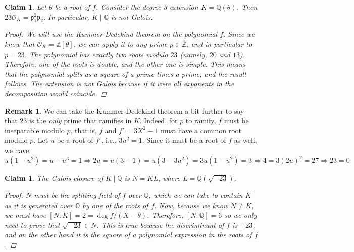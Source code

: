 \documentclass[11pt]{article}
\newtheorem{claim}[theorem]{Claim}
\theoremstyle{definition}
\newtheorem*{rk}{Remark}
\begin{document}
    \begin{claim}
        Let $\theta$ be a root of $f$.
        Consider the degree 3 extension $K = \mathbb{Q}(\theta)$.
        Then $23 \mathcal{O}_K = \mathfrak{p}_1^2 \mathfrak{p}_2$.
        In particular, $K\mid\mathbb{Q}$ is not Galois.
        \begin{proof}
            We will use the Kummer-Dedekind theorem on the polynomial $f$.
            Since we know that $\mathcal{O}_K = \mathbb{Z}[\theta]$, we can apply it to any prime $p \in \mathbb{Z}$,
            and in particular to $p = 23$.
            The polynomial has exactly two roots modulo $23$ (namely, $20$ and $13$).
            Therefore, one of the roots is double, and the other one is simple.
            This means that the polynomial splits as a square of a prime times a prime,
            and the result follows.
            The extension is not Galois because if it were all exponents in the decomposition would coincide.
        \end{proof}
    \end{claim}

    \begin{rk}
        We can take the Kummer-Dedekind theorem a bit further to say that $23$ is the \textit{only} prime that ramifies in $K$.
        Indeed, for $p$ to ramify, $f$ must be inseparable modulo $p$, that is, $f$ and $f' = 3X^2-1$ must have a common root modulo $p$.
        Let $u$ be a root of $f'$, i.e., $3u^2=1$.
        Since it must be a root of $f$ as well, we have:
        \[u(1-u^2) = u-u^3 = 1 \Rightarrow 2u = u(3-1) = u(3-3u^2) = 3u(1-u^2) = 3 \Rightarrow 4 = 3(2u)^2 = 27 \Rightarrow 23 = 0\]

    \end{rk}

    \begin{claim}
        The Galois closure of $K\mid\mathbb{Q}$ is $N = KL$,
        where $L = \mathbb{Q}\left(\sqrt{-23}\right)$.
        \begin{proof}

            $N$ must be the splitting field of $f$ over $\mathbb{Q}$,
            which we can take to contain $K$ as it is generated over $\mathbb{Q}$ by one of the roots of $f$.
            Now, because we know $N \neq K$, we must have $[N:K] = 2 = \deg f/(X - \theta)$.
            Therefore, $[N:\mathbb{Q}] = 6$ so we only need to prove that $\sqrt {-23} \in N$.
            This is true because the discriminant of $f$ is $-23$, and on the other hand it is the square of
            a polynomial expression in the roots of $f$.
        \end{proof}
        
    \end{claim}
\end{document}

